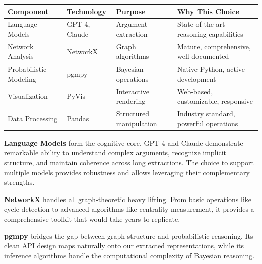 \documentclass[
  11pt,
  letterpaper,
  openany]{book}
\begin{document}
\begin{longtable}[]{@{}
  >{\raggedright\arraybackslash}p{}
  >{\raggedright\arraybackslash}p{}
  >{\raggedright\arraybackslash}p{}
  >{\raggedright\arraybackslash}p{}@{}}
\toprule\noalign{}
\begin{minipage}[b]{\linewidth}\raggedright
Component
\end{minipage} & \begin{minipage}[b]{\linewidth}\raggedright
Technology
\end{minipage} & \begin{minipage}[b]{\linewidth}\raggedright
Purpose
\end{minipage} & \begin{minipage}[b]{\linewidth}\raggedright
Why This Choice
\end{minipage} \\
\midrule\noalign{}
\endhead
\bottomrule\noalign{}
\endlastfoot
Language Models & GPT-4, Claude & Argument extraction & State-of-the-art
reasoning capabilities \\
Network Analysis & NetworkX & Graph algorithms & Mature, comprehensive,
well-documented \\
Probabilistic Modeling & pgmpy & Bayesian operations & Native Python,
active development \\
Visualization & PyVis & Interactive rendering & Web-based, customizable,
responsive \\
Data Processing & Pandas & Structured manipulation & Industry standard,
powerful operations \\
\end{longtable}

\textbf{Language Models} form the cognitive core. GPT-4 and Claude
demonstrate remarkable ability to understand complex arguments,
recognize implicit structure, and maintain coherence across long
extractions. The choice to support multiple models provides robustness
and allows leveraging their complementary strengths.

\textbf{NetworkX} handles all graph-theoretic heavy lifting. From basic
operations like cycle detection to advanced algorithms like centrality
measurement, it provides a comprehensive toolkit that would take years
to replicate.

\textbf{pgmpy} bridges the gap between graph structure and probabilistic
reasoning. Its clean API design maps naturally onto our extracted
representations, while its inference algorithms handle the computational
complexity of Bayesian reasoning.
\end{document}
